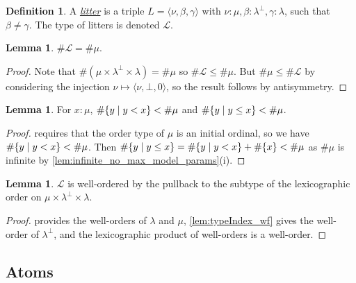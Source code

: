 \documentclass{article}
\newcommand{\cdef}[3]{\href{https://leanprover-community.github.io/con-nf/doc/ConNF/#1.html\#ConNF.#2}{\emph{#3}}}
\theoremstyle{definition}
\newtheorem{definition}{Definition}[section]
\newtheorem{lemma}[theorem]{Lemma}
\theoremstyle{remark}
\begin{document}
\begin{definition}
    A \cdef{Atom/Litter}{Litter}{litter} is a triple \( L = \langle \nu, \beta, \gamma \rangle \) with \( \nu : \mu, \beta : \lambda^\bot, \gamma : \lambda \), such that \( \beta \neq \gamma \).
    The type of litters is denoted \( \mathcal L \).
\end{definition}
\begin{lemma}
    \label{lem:mk_litter}
    \( \#\mathcal L = \#\mu \).
\end{lemma}
\begin{proof}
    Note that \( \#(\mu \times \lambda^\bot \times \lambda) = \#\mu \) so \( \#\mathcal L \leq \#\mu \).
    But \( \#\mu \leq \#\mathcal L \) by considering the injection \( \nu \mapsto \langle \nu, \bot, 0 \rangle \), so the result follows by antisymmetry.
\end{proof}
\begin{lemma}
    \label{lem:card_Iio_lt}
    For \( x : \mu \), \( \#\qty{y \mid y < x} < \#\mu \) and \( \#\qty{y \mid y \leq x} < \#\mu \).
\end{lemma}
\begin{proof}
     requires that the order type of \( \mu \) is an initial ordinal, so we have \( \#\qty{y \mid y < x} < \#\mu \).
    Then \( \#\qty{y \mid y \leq x} = \#\qty{y \mid y < x} + \#\qty{x} < \#\mu \) as \( \#\mu \) is infinite by \cref{lem:infinite_no_max_model_params}(i).
\end{proof}
\begin{lemma}
    \label{lem:litter_wf}
    \( \mathcal L \) is well-ordered by the pullback to the subtype of the lexicographic order on \( \mu \times \lambda^\bot \times \lambda \).
\end{lemma}
\begin{proof}
     provides the well-orders of \( \lambda \) and \( \mu \), \cref{lem:typeIndex_wf} gives the well-order of \( \lambda^\bot \), and the lexicographic product of well-orders is a well-order.
\end{proof}

\subsection{Atoms}
\end{document}
